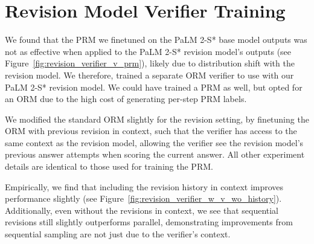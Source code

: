 \documentclass[11pt, letterpaper, logo]{googledeepmind}
\begin{document}
\section{Revision Model Verifier Training}
\label{app:revision_verifier}

We found that the PRM we finetuned on the PaLM 2-S* base model outputs was not as effective when applied to the PaLM 2-S* revision model's outputs (see Figure~\ref{fig:revision_verifier_v_prm}), likely due to distribution shift with the revision model. We therefore, trained a separate ORM verifier to use with our PaLM 2-S* revision model. We could have trained a PRM as well, but opted for an ORM due to the high cost of generating per-step PRM labels.

We modified the standard ORM slightly for the revision setting, by finetuning the ORM with previous revision in context, such that the verifier has access to the same context as the revision model, allowing the verifier see the revision model's previous answer attempts when scoring the current answer. All other experiment details are identical to those used for training the PRM.

Empirically, we find that including the revision history in context improves performance slightly (see Figure~\ref{fig:revision_verifier_w_v_wo_history}). Additionally, even without the revisions in context, we see that sequential revisions still slightly outperforms parallel, demonstrating improvements from sequential sampling are not just due to the verifier's context.
\end{document}

